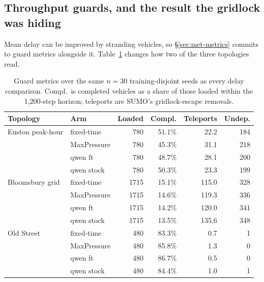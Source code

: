 \subsection{Throughput guards, and the result the gridlock was hiding}\label{sec:res-guards}
\label{sec:res-calib}
Mean delay can be improved by stranding vehicles, so \S\ref{sec:met-metrics}
commits to guard metrics alongside it. Table~\ref{tab:guards} changes how
two of the three topologies read.

\begin{table}[t]
\centering
\small
\begin{tabular}{llrrrr}
\toprule
Topology & Arm & Loaded & Compl. & Teleports & Undep. \\
\midrule
Euston peak-hour & fixed-time & 780 & 51.1\% & 22.2 & 184 \\
 & MaxPressure & 780 & 45.3\% & 31.1 & 218 \\
 & qwen ft & 780 & 48.7\% & 28.1 & 200 \\
 & qwen stock & 780 & 50.3\% & 23.3 & 199 \\
Bloomsbury grid & fixed-time & 1715 & 15.1\% & 115.0 & 328 \\
 & MaxPressure & 1715 & 14.6\% & 119.3 & 336 \\
 & qwen ft & 1715 & 14.2\% & 120.0 & 341 \\
 & qwen stock & 1715 & 13.5\% & 135.6 & 348 \\
Old Street & fixed-time & 480 & 83.3\% & 0.7 & 1 \\
 & MaxPressure & 480 & 85.8\% & 1.3 & 0 \\
 & qwen ft & 480 & 86.7\% & 0.5 & 0 \\
 & qwen stock & 480 & 84.4\% & 1.0 & 1 \\
\bottomrule
\end{tabular}
\caption{Guard metrics over the same $n{=}30$ training-disjoint seeds as
every delay comparison. Compl.\ is completed vehicles as a share of those
loaded within the 1{,}200-step horizon; teleports are SUMO's
gridlock-escape removals.}
\label{tab:guards}
\end{table}

